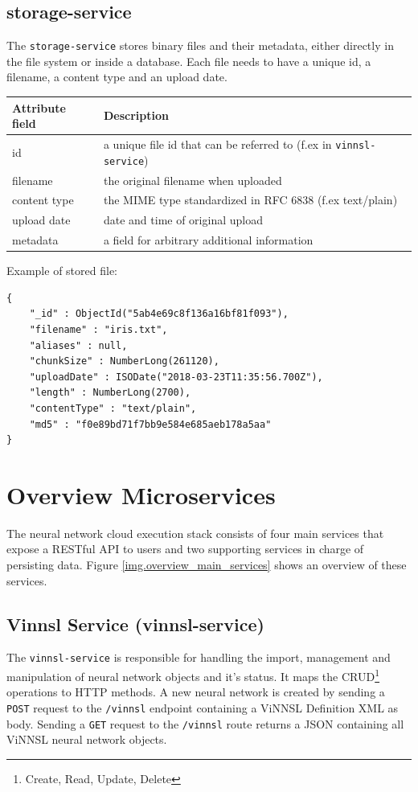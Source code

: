 \subsection{storage-service}\label{storage-service}

The \texttt{storage-service} stores binary files and their metadata,
either directly in the file system or inside a database. Each file needs
to have a unique id, a filename, a content type and an upload date.

\begin{longtable}[]{@{}ll@{}}
\toprule
Attribute field & Description\tabularnewline
\midrule
\endhead
id & a unique file id that can be referred to (f.ex in
\texttt{vinnsl-service})\tabularnewline
filename & the original filename when uploaded\tabularnewline
content type & the MIME type standardized in RFC 6838 (f.ex
text/plain)\tabularnewline
upload date & date and time of original upload\tabularnewline
metadata & a field for arbitrary additional information\tabularnewline
\bottomrule
\end{longtable}

Example of stored file:

\begin{verbatim}
{
    "_id" : ObjectId("5ab4e69c8f136a16bf81f093"),
    "filename" : "iris.txt",
    "aliases" : null,
    "chunkSize" : NumberLong(261120),
    "uploadDate" : ISODate("2018-03-23T11:35:56.700Z"),
    "length" : NumberLong(2700),
    "contentType" : "text/plain",
    "md5" : "f0e89bd71f7bb9e584e685aeb178a5aa"
}
\end{verbatim}

\section{Overview Microservices}\label{overview-microservices}

The neural network cloud execution stack consists of four main services
that expose a RESTful API to users and two supporting services in charge
of persisting data. Figure \ref{img.overview_main_services} shows an
overview of these services.

\subsection{Vinnsl Service
(vinnsl-service)}\label{vinnsl-service-vinnsl-service}

The \texttt{vinnsl-service} is responsible for handling the import,
management and manipulation of neural network objects and it's status.
It maps the CRUD\footnote{Create, Read, Update, Delete} operations to
HTTP methods. A new neural network is created by sending a \texttt{POST}
request to the \texttt{/vinnsl} endpoint containing a ViNNSL Definition
XML as body. Sending a \texttt{GET} request to the \texttt{/vinnsl}
route returns a JSON containing all ViNNSL neural network objects.


